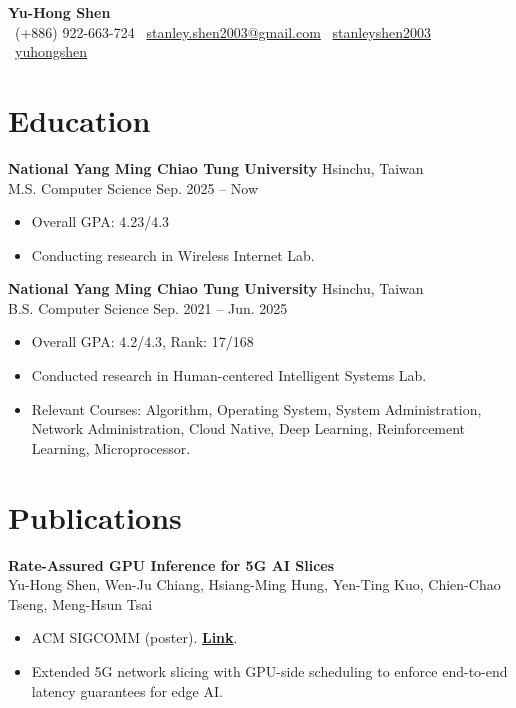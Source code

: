 \documentclass[10pt,a4paper]{article}
\begin{document}
\vspace{24pt}
\begin{center}
{\huge \textbf{Yu-Hong Shen}} \\[6pt]
\faPhone\ (+886) 922-663-724 \quad
\faEnvelope\ \href{mailto:stanley.shen2003@gmail.com}{stanley.shen2003@gmail.com} \quad
\faGithub\ \href{https://github.com/stanleyshen2003}{stanleyshen2003} \quad
\faLinkedin\ \href{https://linkedin.com/in/yuhongshen}{yuhongshen}
\end{center}
\vspace{-20pt}
\section*{Education}

\textbf{National Yang Ming Chiao Tung University} \hfill Hsinchu, Taiwan \\
M.S. Computer Science \hfill Sep. 2025 -- Now
\begin{itemize}
  \item Overall GPA: 4.23/4.3
  \item Conducting research in Wireless Internet Lab.
\end{itemize}

\textbf{National Yang Ming Chiao Tung University} \hfill Hsinchu, Taiwan \\
B.S. Computer Science \hfill Sep. 2021 -- Jun. 2025
\begin{itemize}
  \item Overall GPA: 4.2/4.3, Rank: 17/168
  \item Conducted research in Human-centered Intelligent Systems Lab.
  \item Relevant Courses: Algorithm, Operating System, System Administration, Network Administration, Cloud Native, Deep Learning, Reinforcement Learning, Microprocessor.
\end{itemize}

\section*{Publications}

\textbf{Rate-Assured GPU Inference for 5G AI Slices} \\
Yu-Hong Shen, Wen-Ju Chiang, Hsiang-Ming Hung, Yen-Ting Kuo, Chien-Chao Tseng, Meng-Hsun Tsai
\begin{itemize}
  \item ACM SIGCOMM (poster). \href{https://dl.acm.org/doi/10.1145/3789240.3830291}{\textbf{Link}}.
  \item Extended 5G network slicing with GPU-side scheduling to enforce end-to-end latency guarantees for edge AI.
\end{itemize}
\end{document}
